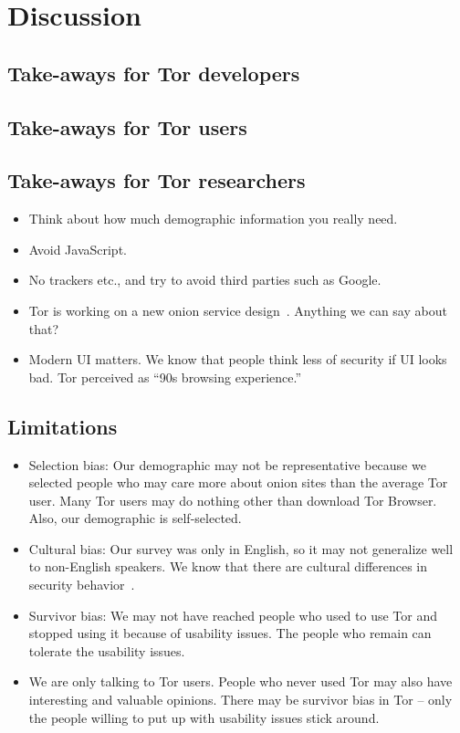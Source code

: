 \section{Discussion}
\label{sec:discussion}

\subsection{Take-aways for Tor developers}
\subsection{Take-aways for Tor users}
\subsection{Take-aways for Tor researchers}
\begin{itemize}
    \item Think about how much demographic information you really need.
    \item Avoid JavaScript.
    \item No trackers etc., and try to avoid third parties such as Google.
\end{itemize}

\begin{itemize}
    \item Tor is working on a new onion service design~\cite{Mathewson2013a}.
        Anything we can say about that?
    \item Modern UI matters.  We know that people think less of security if UI
        looks bad.  Tor perceived as ``90s browsing experience.''
\end{itemize}

\subsection{Limitations}
\begin{itemize}
    \item Selection bias: Our demographic may not be representative because we
        selected people who may care more about onion sites than the average Tor
        user.  Many Tor users may do nothing other than download Tor Browser.
        Also, our demographic is self-selected.
    \item Cultural bias: Our survey was only in English, so it may not
        generalize well to non-English speakers.  We know that there are
        cultural differences in security behavior~\cite{Sawaya2017a}.
    \item Survivor bias: We may not have reached people who used to use Tor and
        stopped using it because of usability issues.  The people who remain can
        tolerate the usability issues.
    \item We are only talking to Tor users.  People who never used Tor may also
        have interesting and valuable opinions.  There may be survivor bias in
        Tor -- only the people willing to put up with usability issues stick
        around.
\end{itemize}
